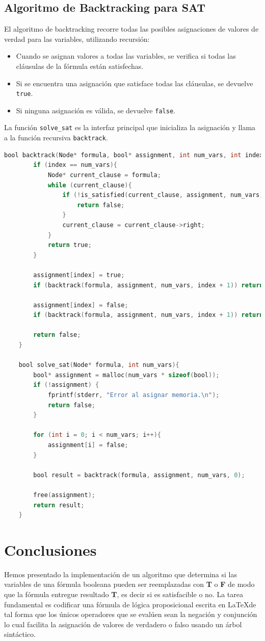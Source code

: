 \documentclass{report}
\begin{document}
	\subsection{Algoritmo de Backtracking para SAT}

	El algoritmo de backtracking recorre todas las posibles asignaciones de valores de verdad para las variables, utilizando recursión:

	\begin{itemize}
		\item Cuando se asignan valores a todas las variables, se verifica si todas las cláusulas de la fórmula están satisfechas.
		\item Si se encuentra una asignación que satisface todas las cláusulas, se devuelve \texttt{true}.
		\item Si ninguna asignación es válida, se devuelve \texttt{false}.
	\end{itemize}

	La función \texttt{solve\_sat} es la interfaz principal que inicializa la asignación y llama a la función recursiva \texttt{backtrack}.

	\begin{lstlisting}[language=C, caption={Backtracking para resolver SAT}]
	bool backtrack(Node* formula, bool* assignment, int num_vars, int index){
		if (index == num_vars){
			Node* current_clause = formula;
			while (current_clause){
				if (!is_satisfied(current_clause, assignment, num_vars)){
					return false;
				}
				current_clause = current_clause->right;
			}
			return true;
		}

		assignment[index] = true;
		if (backtrack(formula, assignment, num_vars, index + 1)) return true;

		assignment[index] = false;
		if (backtrack(formula, assignment, num_vars, index + 1)) return true;

		return false;
	}

	bool solve_sat(Node* formula, int num_vars){
		bool* assignment = malloc(num_vars * sizeof(bool));
		if (!assignment) {
			fprintf(stderr, "Error al asignar memoria.\n");
			return false;
		}

		for (int i = 0; i < num_vars; i++){
			assignment[i] = false;
		}

		bool result = backtrack(formula, assignment, num_vars, 0);

		free(assignment);
		return result;
	}
	\end{lstlisting}
	\newpage
	\section{Conclusiones}
	Hemos presentado la implementaci\'on de un algoritmo que determina si las variables de una f\'ormula booleana pueden ser reemplazadas con \textbf{T}	o \textbf{F} de modo que la f\'ormula entregue resultado \textbf{T}, es decir si es satisfacible o no. La tarea fundamental es codificar una f\'ormula de l\'ogica proposicional escrita en \LaTeX \;de tal forma que los \'unicos operadores que se eval\'uen sean la negaci\'on y conjunci\'on lo cual facilita la asignaci\'on de valores de verdadero o falso usando un \'arbol sint\'actico.
\end{document}
